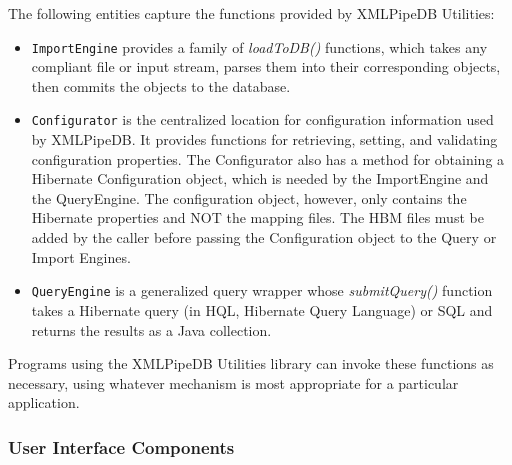 \documentclass[11pt]{article}
\begin{document}
The following entities capture the functions provided by XMLPipeDB Utilities:
\begin{itemize}
\item \texttt{ImportEngine} provides a family of \emph{loadToDB()} functions, which takes any compliant file or input stream, parses them into their corresponding objects, then commits the objects to the database.

\item \texttt{Configurator} is the centralized location for configuration information used by XMLPipeDB.  It provides functions for retrieving, setting, and validating configuration properties. The Configurator also has a method for obtaining a Hibernate Configuration object, which is needed by the ImportEngine and the QueryEngine. The configuration object, however, only contains the Hibernate properties and NOT the mapping files. The HBM files must be added by the caller before passing the Configuration object to the Query or Import Engines.

\item \texttt{QueryEngine} is a generalized query wrapper whose \emph{submitQuery()} function takes a Hibernate query (in HQL, Hibernate Query Language) or SQL and returns the results as a Java collection.
\end{itemize}
Programs using the XMLPipeDB Utilities library can invoke these functions as necessary, using whatever mechanism is most appropriate for a particular application.

\subsubsection{User Interface Components}
\end{document}
